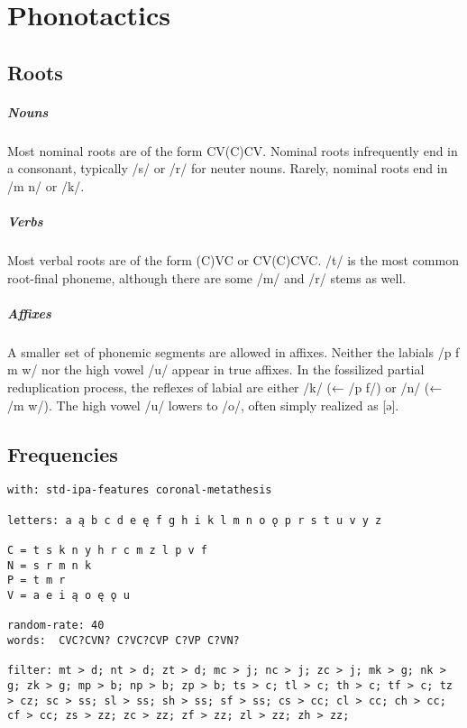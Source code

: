 \setchapterpreamble[u]{\margintoc}
\chapter{Phonotactics}
\section{Roots}
\paragraph{Nouns}
Most nominal roots are of the form CV(C)CV. Nominal roots infrequently end in a consonant, typically /s/ or /r/ for neuter nouns. Rarely, nominal roots end in /m n/ or /k/.

\paragraph{Verbs}
Most verbal roots are of the form (C)VC or CV(C)CVC. /t/ is the most common root-final phoneme, although there are some /m/ and /r/ stems as well.

\paragraph{Affixes}
A smaller set of phonemic segments are allowed in affixes. Neither the labials /p f m w/ nor the high vowel /u/ appear in true affixes. In the fossilized partial reduplication process, the reflexes of labial are either /k/ (← /p f/) or /n/ (← /m w/). The high vowel /u/ lowers to /o/, often simply realized as [ə].

\section{Frequencies}
\begin{kaobox}[frametitle=WIP Lexifer file]
\begin{verbatim}
with: std-ipa-features coronal-metathesis

letters: a ą b c d e ę f g h i k l m n o ǫ p r s t u v y z 

C = t s k n y h r c m z l p v f
N = s r m n k
P = t m r
V = a e i ą o ę ǫ u

random-rate: 40
words:  CVC?CVN? C?VC?CVP C?VP C?VN?

filter: mt > d; nt > d; zt > d; mc > j; nc > j; zc > j; mk > g; nk > g; zk > g; mp > b; np > b; zp > b; ts > c; tl > c; th > c; tf > c; tz > cz; sc > ss; sl > ss; sh > ss; sf > ss; cs > cc; cl > cc; ch > cc; cf > cc; zs > zz; zc > zz; zf > zz; zl > zz; zh > zz;
\end{verbatim}
\end{kaobox}